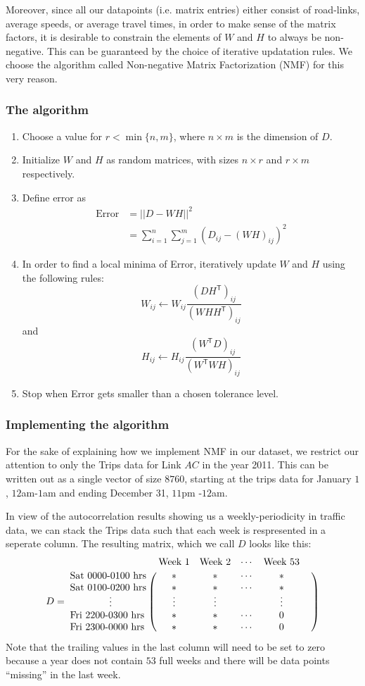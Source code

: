 \documentclass[10pt,a4paper]{amsart}
\begin{document}
Moreover, since all our datapoints (i.e. matrix entries) either consist of
road-links, average speeds, or average travel times, in order to make sense
of the matrix factors, it is desirable to constrain the elements of \(W\)
and \(H\) to always be non-negative. This can be guaranteed by the choice of
iterative updatation rules. We choose the algorithm called Non-negative Matrix
Factorization (NMF) for this very reason.

\subsubsection{The algorithm}
\begin{enumerate}
	\item Choose a value for \(r<\min\{n,m\}\), where \(n\times m\) is the
		dimension of \(D\).
	\item Initialize \(W\) and \(H\) as random matrices, with sizes \(n\times
		r\) and \(r\times m\) respectively.
	\item Define error as
		\begin{align*}
			\text{Error}	&= ||D-WH||^2\\
						&= \sum_{i=1}^{n}\sum_{j=1}^{m}\left(D_{ij}-(WH)_{ij}
						\right)^2
		\end{align*}
	\item In order to find a local minima of Error, iteratively update \(W\)
		and \(H\) using the following rules:
		\[W_{ij}\leftarrow
			W_{ij}\frac{(DH^\mathsf{T})_{ij}}{(WHH^\mathsf{T})_{ij}}\]
		and
		\[H_{ij}\leftarrow
			H_{ij}\frac{(W^\mathsf{T}D)_{ij}}{(W^\mathsf{T}WH)_{ij}}\]
	\item Stop when Error gets smaller than a chosen tolerance level.
\end{enumerate}

\subsubsection{Implementing the algorithm}
For the sake of explaining how we implement NMF in our dataset, we restrict
our attention to only the Trips data for Link \(AC\) in the year 2011. This
can be written out as a single vector of size \(8760\), starting at the trips
data for January \(1\), \(12\)am-\(1\)am and ending December 31, \(11\)pm
-\(12\)am.

In view of the autocorrelation results showing us a weekly-periodicity in
traffic data, we can stack the Trips data such that each week is respresented
in a seperate column. The resulting matrix, which we call \(D\) looks like
this:
\[ D= \bordermatrix{
		~ & \text{Week 1} & \text{Week 2} & \cdots & \text{Week 53} & \cr
    		\text{Sat 0000-0100 hrs} & * & * & \cdots & * \cr
    		\text{Sat 0100-0200 hrs} & * & * & \cdots & * \cr
    		\qquad\qquad\vdots & \vdots & \vdots & ~ & \vdots \cr
		\text{Fri 2200-0300 hrs} & * & * & \cdots & 0 \cr
		\text{Fri 2300-0000 hrs} & * & * & \cdots & 0 \cr	}\]
Note that the trailing values in the last column will need to be set to zero
because a year does not contain \(53\) full weeks and there will be data
points ``missing'' in the last week.
\end{document}
